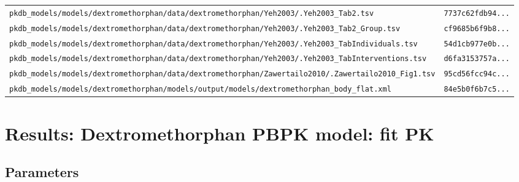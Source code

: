 \begin{longtable}{ll}
\texttt{pkdb\_models/models/dextromethorphan/data/dextromethorphan/Yeh2003/.Yeh2003\_Tab2.tsv} & \texttt{7737c62fdb94...} \\
\texttt{pkdb\_models/models/dextromethorphan/data/dextromethorphan/Yeh2003/.Yeh2003\_Tab2\_Group.tsv} & \texttt{cf9685b6f9b8...} \\
\texttt{pkdb\_models/models/dextromethorphan/data/dextromethorphan/Yeh2003/.Yeh2003\_TabIndividuals.tsv} & \texttt{54d1cb977e0b...} \\
\texttt{pkdb\_models/models/dextromethorphan/data/dextromethorphan/Yeh2003/.Yeh2003\_TabInterventions.tsv} & \texttt{d6fa3153757a...} \\
\texttt{pkdb\_models/models/dextromethorphan/data/dextromethorphan/Zawertailo2010/.Zawertailo2010\_Fig1.tsv} & \texttt{95cd56fcc94c...} \\
\texttt{pkdb\_models/models/dextromethorphan/models/output/models/dextromethorphan\_body\_flat.xml} & \texttt{84e5b0f6b7c5...} \\
\end{longtable}

\section{Results: Dextromethorphan PBPK model: fit PK}

\subsection{Parameters}

